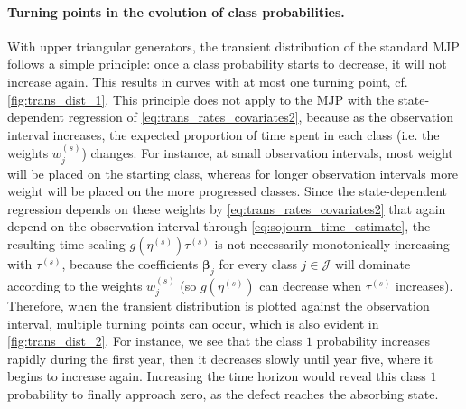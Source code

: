 \paragraph{Turning points in the evolution of class probabilities.} \label{sec:turning_points}
With upper triangular generators, the transient distribution of the standard MJP follows a simple principle: once a class probability starts to decrease, it will not increase again. This results in curves with at most one turning point, cf. \cref{fig:trans_dist_1}. 
This principle does not apply to the MJP with the state-dependent regression of \cref{eq:trans_rates_covariates2}, because as the observation interval increases, the expected proportion of time spent in each class (i.e. the weights $w_j^{(s)}$) changes. For instance, at small observation intervals, most weight will be placed on the starting class, whereas for longer observation intervals more weight will be placed on the more progressed classes.
Since the state-dependent regression depends on these weights by \cref{eq:trans_rates_covariates2} that again depend on the observation interval through \cref{eq:sojourn_time_estimate}, the resulting time-scaling $g(\eta^{(s)}) \tau^{(s)}$ is not necessarily monotonically increasing with $\tau^{(s)}$, because the coefficients $\bm \beta_j$ for every class $j \in \mathcal J$ will dominate according to the weights $w_j^{(s)}$ (so $g(\eta^{(s)})$ can decrease when $\tau^{(s)}$ increases).
Therefore, when the transient distribution is plotted against the observation interval, multiple turning points can occur, which is also evident in \cref{fig:trans_dist_2}. For instance, we see that the class $1$ probability increases rapidly during the first year, then it decreases slowly until year five, where it begins to increase again. Increasing the time horizon would reveal this class $1$ probability to finally approach zero, as the defect reaches the absorbing state.

